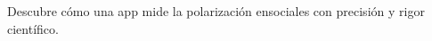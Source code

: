 \documentclass[preview]{standalone}
\begin{document}
\begin{center}
Descubre cómo una app mide la polarización en\nredes sociales con precisión y rigor científico.
\end{center}
\end{document}
